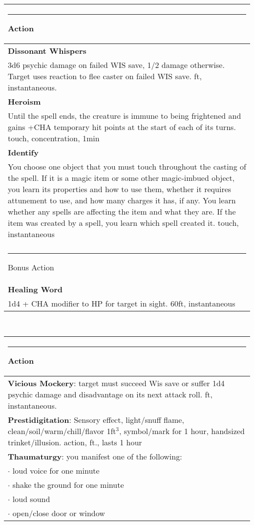 \documentclass[twocolumn]{article}
\begin{document}
\\
\noindent\begin{tabular}{|m{3.1in}|}
\hline
\rule{1.25in}{0pt}Action\\
\hline
\textbf{Dissonant Whispers}\\
3d6 psychic damage on failed WIS save, 1/2 damage otherwise. Target uses reaction to flee caster on failed WIS save.  {\sc 60 ft, instantaneous}.\\
\textbf{Heroism}\\
Until the spell ends, the creature is immune to being frightened and gains +CHA temporary hit points at the start of each of its turns. {\sc touch, concentration, 1min}\\
\textbf{Identify}\\
You choose one object that you must touch throughout the casting of the spell. If it is a magic item or some other magic-imbued object, you learn its properties and how to use them, whether it requires attunement to use, and how many charges it has, if any. You learn whether any spells are affecting the item and what they are. If the item was created by a spell, you learn which spell created it. {\sc touch, instantaneous}\\
\hline\\
\rule{1.1in}{0pt}Bonus Action\\
\hline
\textbf{Healing Word}\\
1d4  + CHA modifier to HP for target in sight. {\sc 60ft, instantaneous}\\
\hline
\end{tabular}
\vspace{8pt}

\\
\noindent\begin{tabular}{|m{3.1in}|}
\hline
\rule{1.25in}{0pt}Action\\
\hline
\textbf{Vicious Mockery}: target must succeed Wis save or suffer 1d4 psychic damage and disadvantage on its next attack roll. {\sc 60 ft, instantaneous.}\\
\hline
\textbf{Prestidigitation}: Sensory effect, light/snuff flame, clean/soil/warm/chill/flavor 1ft$^3$, symbol/mark for 1 hour, handsized trinket/illusion.  {\sc action, \sc 10 ft., lasts 1 hour}\\
\hline
\textbf{Thaumaturgy}: you manifest one of the following: \\
$\cdot$ loud voice for one minute \\
$\cdot$ shake the ground for one minute \\
$\cdot$ loud sound \\
$\cdot$ open/close door or window \\
\hline
\end{tabular}
\vspace{8pt}
\end{document}
